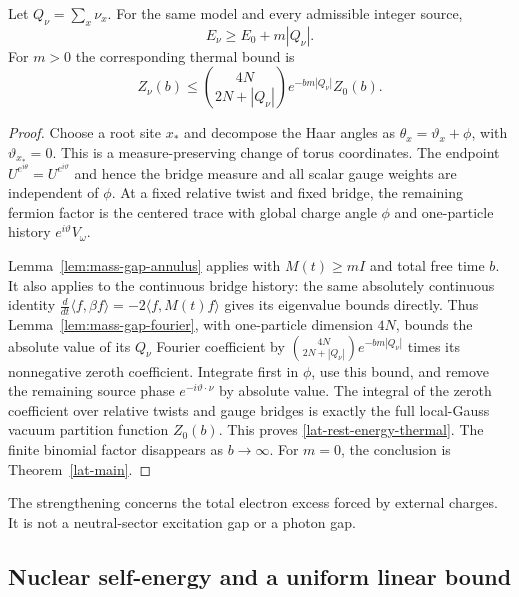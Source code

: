 \begin{corollary}
\label{lat-rest-energy}
Let $Q_\nu=\sum_x\nu_x$.  For the same model and every admissible
integer source,
\begin{equation}
 E_\nu\ge E_0+m|Q_\nu|.
 \label{lat-rest-energy-bound}
\end{equation}
For $m>0$ the corresponding thermal bound is
\begin{equation}
 Z_\nu(b)\le
 \binom{4N}{2N+|Q_\nu|}e^{-bm|Q_\nu|}Z_0(b).
 \label{lat-rest-energy-thermal}
\end{equation}
\end{corollary}
\begin{proof}
Choose a root site $x_*$ and decompose the Haar angles as
$\theta_x=\vartheta_x+\phi$, with $\vartheta_{x_*}=0$.
This is a measure-preserving change of torus coordinates.  The endpoint
$U^{e^{i\theta}}=U^{e^{i\vartheta}}$ and hence the bridge measure and
all scalar gauge weights are independent of $\phi$.  At a fixed
relative twist and fixed bridge, the remaining fermion factor is the
centered trace with global charge angle $\phi$ and one-particle history
$e^{i\vartheta}V_\omega$.

Lemma~\ref{lem:mass-gap-annulus} applies with $M(t)\ge mI$ and total
free time $b$.  It also applies to the continuous bridge history:
the same absolutely continuous identity
$\frac{d}{dt}\langle f,\beta f\rangle=-2\langle f,M(t)f\rangle$
gives its eigenvalue bounds directly.  Thus
Lemma~\ref{lem:mass-gap-fourier}, with one-particle dimension $4N$,
bounds the absolute value of its $Q_\nu$ Fourier coefficient by
$\binom{4N}{2N+|Q_\nu|}e^{-bm|Q_\nu|}$ times its nonnegative zeroth
coefficient.  Integrate first in $\phi$, use this bound, and remove the
remaining source phase $e^{-i\vartheta\cdot\nu}$ by absolute value.
The integral of the zeroth coefficient over relative twists and gauge
bridges is exactly the full local-Gauss vacuum partition function
$Z_0(b)$.  This proves \eqref{lat-rest-energy-thermal}.  The finite
binomial factor disappears as $b\to\infty$.  For $m=0$, the conclusion
is Theorem~\ref{lat-main}.
\end{proof}

The strengthening concerns the total electron excess forced by external
charges.  It is not a neutral-sector excitation gap or a photon gap.

\subsection{Nuclear self-energy and a uniform linear bound}

